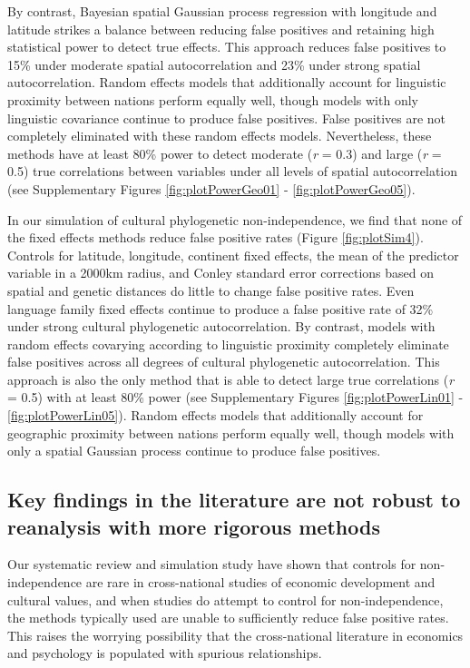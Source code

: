 \documentclass[
  man,floatsintext]{apa6}
\begin{document}
By contrast, Bayesian spatial Gaussian process regression with longitude and latitude strikes a balance between reducing false positives and retaining high statistical power to detect true effects. This approach reduces false positives to 15\% under moderate spatial autocorrelation and 23\% under strong spatial autocorrelation. Random effects models that additionally account for linguistic proximity between nations perform equally well, though models with only linguistic covariance continue to produce false positives. False positives are not completely eliminated with these random effects models. Nevertheless, these methods have at least 80\% power to detect moderate (\emph{r} = 0.3) and large (\emph{r} = 0.5) true correlations between variables under all levels of spatial autocorrelation (see Supplementary Figures \ref{fig:plotPowerGeo01} - \ref{fig:plotPowerGeo05}).

In our simulation of cultural phylogenetic non-independence, we find that none of the fixed effects methods reduce false positive rates (Figure \ref{fig:plotSim4}). Controls for latitude, longitude, continent fixed effects, the mean of the predictor variable in a 2000km radius, and Conley standard error corrections based on spatial and genetic distances do little to change false positive rates. Even language family fixed effects continue to produce a false positive rate of 32\% under strong cultural phylogenetic autocorrelation. By contrast, models with random effects covarying according to linguistic proximity completely eliminate false positives across all degrees of cultural phylogenetic autocorrelation. This approach is also the only method that is able to detect large true correlations (\emph{r} = 0.5) with at least 80\% power (see Supplementary Figures \ref{fig:plotPowerLin01} - \ref{fig:plotPowerLin05}). Random effects models that additionally account for geographic proximity between nations perform equally well, though models with only a spatial Gaussian process continue to produce false positives.

\hypertarget{key-findings-in-the-literature-are-not-robust-to-reanalysis-with-more-rigorous-methods}{%
\subsection{Key findings in the literature are not robust to reanalysis with more rigorous methods}\label{key-findings-in-the-literature-are-not-robust-to-reanalysis-with-more-rigorous-methods}}

Our systematic review and simulation study have shown that controls for non-independence are rare in cross-national studies of economic development and cultural values, and when studies do attempt to control for non-independence, the methods typically used are unable to sufficiently reduce false positive rates. This raises the worrying possibility that the cross-national literature in economics and psychology is populated with spurious relationships.
\end{document}
